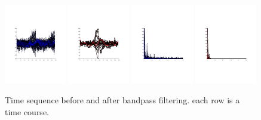 \documentclass[12pt]{article}
\begin{document}
\begin{figure}[htb]
\includegraphics[width = 0.24\textwidth]{figures2/ts_before_25}
\includegraphics[width = 0.24\textwidth]{figures2/ts_after_25}
\includegraphics[width = 0.24\textwidth]{figures2/freq_before_25}
\includegraphics[width = 0.24\textwidth]{figures2/freq_after_25} \\
\caption{Time sequence before and after bandpass filtering. each row is a time course.}
\label{fig104}
\end{figure}
\end{document}
